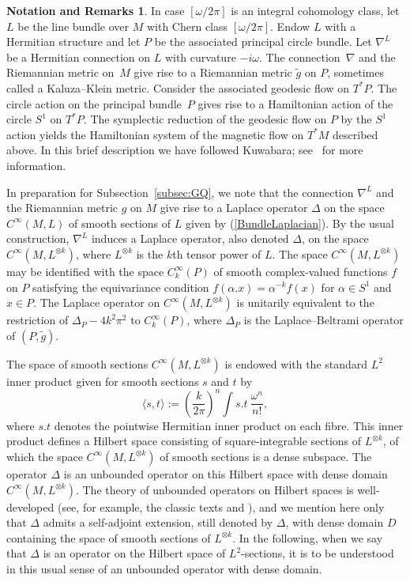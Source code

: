 \documentclass[12pt,leqno]{amsart}%
\theoremstyle{definition}
\newtheorem{notar}[theorem]{Notation and Remarks}
\theoremstyle{remark}
\numberwithin{equation}{section}
\def\nab{{\nabla}}
\begin{document}
\begin{notar}\label{prep} In case $[\omega/2\pi]$ is an integral cohomology
class, let $L$ be the line bundle over $M$ with Chern class
$[\omega/2\pi]$.  Endow $L$ with a Hermitian structure and let $P$ be the
associated principal circle bundle.  Let $\nabla^L$ be a
Hermitian connection on $L$ with curvature $-i\omega$.  The connection~$\nabla$
and the Riemannian metric on~$M$ give rise to a Riemannian metric $\widetilde{g}$ on
$P$, sometimes called a Kaluza--Klein metric. Consider the associated geodesic
flow
on
$T^{\ast}P$. The circle action on the principal bundle~$P$ gives rise to a
Hamiltonian action of the circle $S^{1}$ on $T^{\ast}P$. The symplectic
reduction of the geodesic flow on $P$ by the $S^{1}$ action yields the
Hamiltonian system of the magnetic flow on $T^{\ast}M$ described above. In this
brief description we have followed Kuwabara; see~\cite{Ku03} for more
information.

In preparation for Subsection~\ref{subsec:GQ}, we note that the connection
$\nab^L$ and the Riemannian metric $g$ on
$M$ give rise to a Laplace operator $\Delta$ on the space
$C^\infty(M,L)$ of smooth sections of $L$ given by (\ref{BundleLaplacian}). By
the usual construction, $\nab^L$
induces a Laplace operator, also denoted $\Delta$, on the space
${C^\infty}(M,{L^{\otimes k}})$,
where $L^{\otimes k}$ is the $k$th tensor power of $L$.  The space
${C^\infty}(M,L^{\otimes k})$ may be identified with the space
$C^\infty_k(P)$ of smooth complex-valued functions $f$ on $P$ satisfying the
equivariance condition
$f(\alpha.x)=\alpha^{-k}f(x)$ for $\alpha\in S^{1}$ and $x\in P$. The
Laplace operator on $C^\infty(M,{L^{\otimes k}})$ is unitarily equivalent to
the restriction of $\Delta_P-4k^2\pi^2$ to $C^\infty_k(P)$, where
$\Delta_P$ is the Laplace--Beltrami operator of $(P,\widetilde{g})$.

The space of smooth sections $C^\infty(M,L^{\otimes k})$
is endowed with the standard $L^2$ inner product given for smooth sections $s$
and $t$ by
\[\langle s,t\rangle := \left(\frac{k}{2\pi}\right)^n\int s.t\
\frac{\omega^n}{n!},\]
where $s.t$ denotes the pointwise Hermitian inner product on each fibre.
This inner product defines a Hilbert space consisting of square-integrable
sections of $L^{\otimes k}$, of which the space $C^\infty(M,L^{\otimes k})$ of
smooth sections is a dense subspace. The operator $\Delta$ is an unbounded
operator on this Hilbert space with dense domain $C^\infty(M,L^{\otimes k})$.
The theory of unbounded operators on Hilbert spaces is well-developed (see, for
example, the classic texts \cite[Vol II, Chap. 8]{RS} and \cite{BS}), and we
mention here only
that $\Delta$ admits a self-adjoint extension, still denoted by $\Delta$, with
dense domain $D$ containing the space of smooth sections of $L^{\otimes k}.$ In
the following, when we say that $\Delta$ is an operator on the Hilbert space of
$L^2$-sections, it is to be understood in this usual sense of an unbounded
operator with dense domain.
\end{notar}
\end{document}
